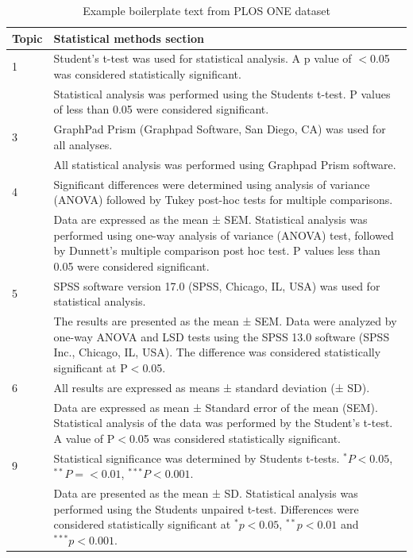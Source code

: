\documentclass[12pt]{article}
\begin{document}
\begin{landscape}
\begin{table}[]
\centering
\caption{Example boilerplate text from PLOS ONE dataset}
\label{tab:plos-example-boilerplate}
\begin{tabular}{p{0.1\linewidth} p{0.9\linewidth}}
\hline
\textbf{Topic} & \textbf{Statistical methods section} \\ \hline
1 & Student’s t-test was used for statistical analysis. A p value of $<$0.05 was considered statistically significant. \\
& Statistical analysis was performed using the Students t-test. P values of less than 0.05 were considered significant.\\
\hline
3 & GraphPad Prism (Graphpad Software, San Diego, CA) was used for all analyses.\\
 & All statistical analysis was performed using Graphpad Prism software.\\
 \hline
4 & Significant differences were determined using analysis of variance (ANOVA) followed by Tukey post-hoc tests for multiple comparisons.\\
& Data are expressed as the mean ± SEM. Statistical analysis was performed using one-way analysis of variance (ANOVA) test, followed by Dunnett’s multiple comparison post hoc test. P values less than 0.05 were considered significant.\\
\hline
5 & SPSS software version 17.0 (SPSS, Chicago, IL, USA) was used for statistical analysis.\\
  & The results are presented as the mean ± SEM. Data were analyzed by one-way ANOVA and LSD tests using the SPSS 13.0 software (SPSS Inc., Chicago, IL, USA). The difference was considered statistically significant at P$<$0.05.\\
  \hline
6 & All results are expressed as means ± standard deviation (± SD).\\
& Data are expressed as mean ± Standard error of the mean (SEM). Statistical analysis of the data was performed by the Student’s t-test. A value of P$<$0.05 was considered statistically significant.\\
\hline
9 & Statistical significance was determined by Students t-tests. $^{*} P<0.05$, $^{**} P = <0.01$, $^{***} P<0.001$.\\
 & Data are presented as the mean ± SD. Statistical analysis was performed using the Students unpaired t-test. Differences were considered statistically significant at $^{*}p<0.05$, $^{**}p<0.01$ and $^{***}p<0.001$.\\
 \hline
\end{tabular}
\end{table}
\end{landscape}
\end{document}
